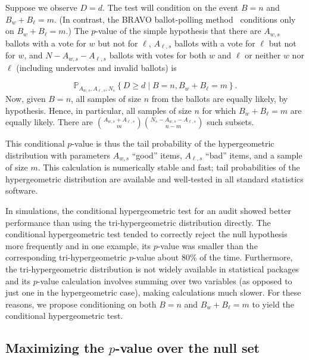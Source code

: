 Suppose we observe $D=d$.
The test will condition on the event $B=n$ and $B_w +B_\ell = m$. 
(In contrast, the BRAVO ballot-polling
method~\citep{lindemanEtal12}
conditions only on $B_w+B_\ell = m$.)
The $p$-value of the simple hypothesis that there are $A_{w,s}$ ballots with
a vote for $w$ but not for $\ell$, $A_{\ell,s}$ ballots with a vote for $\ell$ but not for $w$, 
and $N - A_{w,s} - A_{\ell,s}$ ballots with votes for both $w$ and $\ell$ or neither $w$ nor $\ell$ 
(including undervotes and
invalid ballots) is

\begin{equation}
   \mathbb{P}_{A_{w,s}, A_{\ell,s}, N_s} \left \{ D \geq d \;\vert\; B = n, B_w+B_\ell = m \right \}.
\end{equation}
Now, given $B=n$, all samples of size $n$ from the ballots are equally likely, by hypothesis.
Hence, in particular, all samples of size $n$ for which $B_w + B_\ell = m$ are equally likely.
There are ${A_{w,s}+A_{\ell,s} \choose m}{N_s - A_{w,s}-A_{\ell,s} \choose n-m}$ such subsets.

This conditional $p$-value is thus the tail probability of the hypergeometric distribution
with parameters $A_{w,s}$ ``good'' items, $A_{\ell,s}$ ``bad'' items, and a sample of size $m$.
This calculation is numerically stable and fast; tail probabilities of the hypergeometric distribution are available
and well-tested in all standard statistics software.

In simulations, the conditional hypergeometric test for an audit showed better performance than
using the tri-hypergeometric distribution directly.
The conditional hypergeometric test tended to correctly reject the null hypothesis more frequently and in one example, its $p$-value was
smaller than the corresponding tri-hypergeometric $p$-value about 80\% of the time.
Furthermore, the tri-hypergeometric distribution is not widely available in statistical packages and its $p$-value calculation involves 
summing over two variables (as opposed to just one in the hypergeometric case), making calculations much slower.
For these reasons, we propose conditioning on both $B=n$ and $B_w+B_\ell=m$ to yield the conditional hypergeometric test.

\subsection{Maximizing the $p$-value over the null set}

